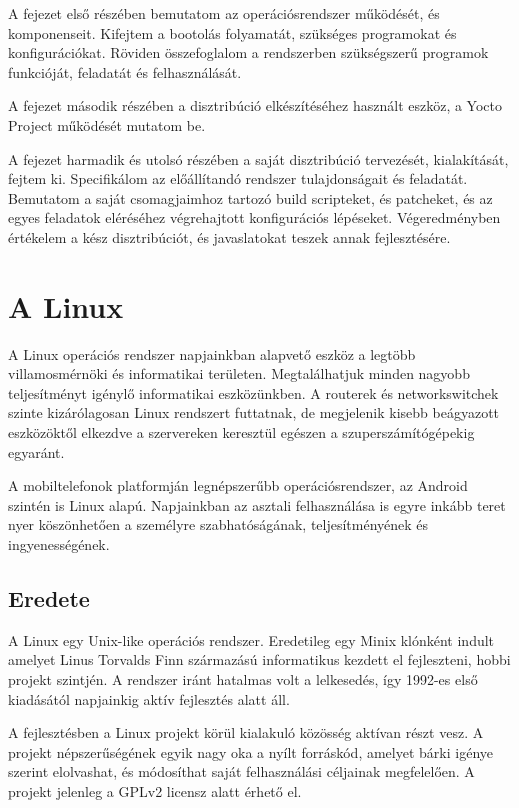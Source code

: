 \medskip

A fejezet első részében bemutatom az operációsrendszer működését, és
komponenseit. Kifejtem a bootolás folyamatát, szükséges programokat és
konfigurációkat. Röviden összefoglalom a rendszerben szükségszerű programok
funkcióját, feladatát és felhasználását.

A fejezet második részében a disztribúció elkészítéséhez használt eszköz, a
Yocto Project működését mutatom be.

A fejezet harmadik és utolsó részében a saját disztribúció tervezését,
kialakítását, fejtem ki. Specifikálom az előállítandó rendszer tulajdonságait és
feladatát. Bemutatom a saját csomagjaimhoz tartozó build
scripteket, és patcheket, és az egyes feladatok eléréséhez végrehajtott
konfigurációs lépéseket. Végeredményben értékelem a kész disztribúciót, és
javaslatokat teszek annak fejlesztésére.


\section{A Linux}

A Linux operációs rendszer napjainkban alapvető eszköz a legtöbb villamosmérnöki
és informatikai területen. Megtalálhatjuk minden nagyobb teljesítményt igénylő
informatikai eszközünkben. A routerek és networkswitchek szinte kizárólagosan
Linux rendszert futtatnak, de megjelenik kisebb beágyazott eszközöktől elkezdve a
szervereken keresztül egészen a szuperszámítógépekig egyaránt.

A mobiltelefonok platformján legnépszerűbb operációsrendszer, az Android szintén
is Linux alapú. Napjainkban az asztali felhasználása is egyre inkább teret nyer
köszönhetően a személyre szabhatóságának, teljesítményének és ingyenességének.

\subsection{Eredete}

A Linux egy Unix-like operációs rendszer. Eredetileg egy Minix klónként indult
amelyet Linus Torvalds Finn származású informatikus kezdett el fejleszteni, hobbi
projekt szintjén. A rendszer iránt hatalmas volt a lelkesedés, így 1992-es első
kiadásától napjainkig aktív fejlesztés alatt áll. 

\medskip

A fejlesztésben a Linux projekt körül kialakuló közösség aktívan részt vesz. A
projekt népszerűségének egyik nagy oka a nyílt forráskód, amelyet bárki igénye
szerint elolvashat, és módosíthat saját felhasználási céljainak megfelelően. A
projekt jelenleg a GPLv2 licensz alatt érhető el.

